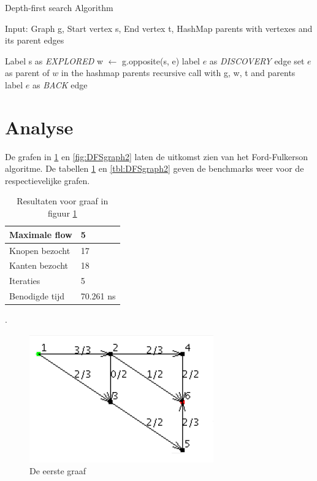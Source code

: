 \begin{algorithm}[h]
\caption{Depth-first search Algorithm}
\label{alg:DFS}
\begin{algorithmic}
\REQUIRE Input: Graph g, Start vertex s, End vertex t, HashMap parents with vertexes and its parent edges

\STATE Label s as \textit{EXPLORED}
\STATE w $\gets$ g.opposite(s, e)
\STATE label $e$ as \textit{DISCOVERY} edge
\STATE set $e$ as parent of $w$ in the hashmap parents
\STATE recursive call with g, w, t and parents
\ELSE
\STATE label $e$ as \textit{BACK} edge
\ENDIF
\ENDIF
\ENDFOR
\end{algorithmic}
\end{algorithm}

\section{Analyse}

De grafen in \ref{fig:DFSgraph1} en \ref{fig:DFSgraph2} laten de uitkomst zien van het Ford-Fulkerson algoritme. De tabellen \ref{tbl:DFSgraph1} en \ref{tbl:DFSgraph2} geven de benchmarks weer voor de respectievelijke grafen.

\begin{table}[h]
 \begin{tabularx}{\linewidth}{| l | X |}
 \hline
 Maximale flow & 5 \\
 \hline
 Knopen bezocht & 17 \\
 \hline
 Kanten bezocht & 18 \\
 \hline
 Iteraties & 5 \\
 \hline
 Benodigde tijd & 70.261 ns \\
 \hline
\end{tabularx}
\centering
\caption{Resultaten voor graaf in figuur \ref{fig:DFSgraph1}}.
\label{tbl:DFSgraph1}
\end{table}

\begin{figure}[h]
	\includegraphics{depthfirst/DFSgraph1}
	\centering
	\caption{De eerste graaf}
	\label{fig:DFSgraph1}
\end{figure}

